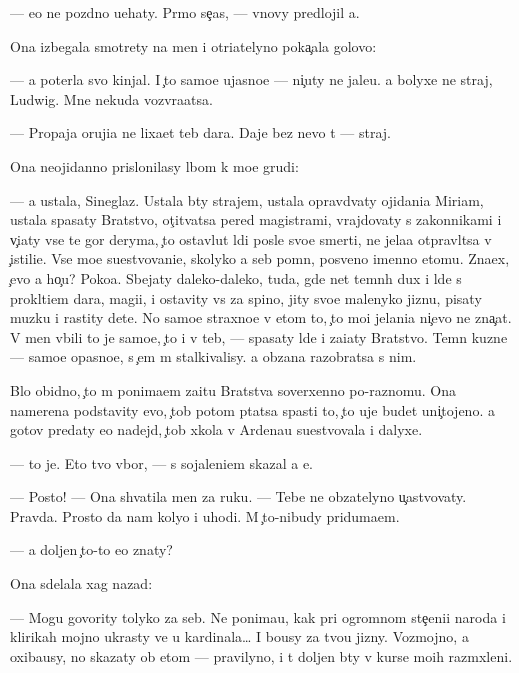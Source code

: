 \documentclass[10pt]{book}
\begin{document}
— {\y}e{\x}o ne pozdno u{\y}ehaty. Pr{\ia}mo se{\y}{\c}as, — vnovy predlojil {\y}a.

Ona izbegala smotrety na men{\ia} i otri{\q}atelyno poka{\c}ala golovo{\y}:

— {\Y}a poter{\ia}la svo{\y} kinjal. I {\c}to samo{\y}e ujasno{\y}e — ni{\c}uty ne jale{\y}u. {\Y}a bolyxe ne straj, Ludwig. Mne nekuda vozvra{\x}atsa.

— Propaja oruji{\y}a ne lixa{\y}et teb{\ia} dara. Daje bez nevo t{\yi} — straj.

Ona neojidanno prislonilasy lbom k mo{\y}e{\y} grudi:

— {\Y}a ustala, Sineglaz{\yi}{\y}. Ustala b{\yi}ty strajem, ustala opravd{\yi}vaty ojidani{\y}a Miriam, ustala spasaty Bratstvo, ot{\c}it{\yi}vatsa pered magistrami, vrajdovaty s zakonnikami i v{\yi}{\c}i{\x}aty vse te gor{\yi} deryma, {\c}to ostavl{\ia}{\y}ut l{\iu}di posle svo{\y}e{\y} smerti, ne jela{\y}a otpravl{\ia}tsa v {\c}istili{\x}e. Vse mo{\y}e su{\x}estvovani{\y}e, skolyko {\y}a seb{\ia} pomn{\iu}, posv{\ia}{\x}eno imenno etomu. Zna{\y}ex, {\c}evo {\y}a ho{\c}u? Poko{\y}a. Sbejaty daleko-daleko, tuda, gde net temn{\yi}h dux i l{\iu}de{\y} s prokl{\ia}ti{\y}em dara, magi{\y}i, i ostavity vs{\e} za spino{\y}, jity svo{\y}e{\y} malenyko{\y} jizn{\y}u, pisaty muz{\yi}ku i rastity dete{\y}. No samo{\y}e straxno{\y}e v etom to, {\c}to mo{\y}i jelani{\y}a ni{\c}evo ne zna{\c}at. V men{\ia} vbili to je samo{\y}e, {\c}to i v teb{\ia}, — spasaty l{\iu}de{\y} i za{\x}i{\x}aty Bratstvo. Temn{\yi}{\y} kuzne{\q} — samo{\y}e opasno{\y}e, s {\c}em m{\yi} stalkivalisy. {\Y}a ob{\ia}zana razobratsa s nim.

B{\yi}lo obidno, {\c}to m{\yi} ponima{\y}em za{\x}itu Bratstva soverxenno po-raznomu. Ona namerena podstavity {\y}evo, {\c}tob{\yi} potom p{\yi}tatsa spasti to, {\c}to uje budet uni{\c}tojeno. {\Y}a gotov predaty {\y}e{\y}o nadejd{\yi}, {\c}tob{\yi} xkola v Ardenau su{\x}estvovala i dalyxe.

— {\C}to je. Eto tvo{\y} v{\yi}bor, — s sojaleni{\y}em skazal {\y}a {\y}e{\y}.

— Posto{\y}! — Ona shvatila men{\ia} za ruku. — Tebe ne ob{\ia}zatelyno u{\c}astvovaty. Pravda. Prosto da{\y} nam koly{\q}o i uhodi. M{\yi} {\c}to-nibudy priduma{\y}em.

— {\Y}a doljen {\c}to-to {\y}e{\x}o znaty?

Ona sdelala xag nazad:

— Mogu govority tolyko za seb{\ia}. Ne ponima{\y}u, kak pri ogromnom ste{\c}eni{\y}i naroda i klirikah mojno ukrasty ve{\x} u kardinala… I bo{\y}usy za tvo{\y}u jizny. Vozmojno, {\y}a oxiba{\y}usy, no skazaty ob etom — pravilyno, i t{\yi} doljen b{\yi}ty v kurse mo{\y}ih razm{\yi}xleni{\y}.
\end{document}
